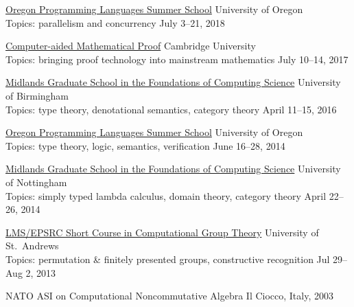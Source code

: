 \newcommand\ssitem[5]{\href{#1}{#2} \hfill #3 \\ Topics: #4 \hfill #5}

\ssitem
    {https://www.cs.uoregon.edu/research/summerschool/summer18/topics.php}
    {Oregon Programming Languages Summer School}
    {University of Oregon}
    {parallelism and concurrency}
    {July 3--21, 2018}

    \vspace{-3mm}

\ssitem
    {https://www.newton.ac.uk/event/bprw01}
    {Computer-aided Mathematical Proof}
    {Cambridge University}
    {bringing proof technology into mainstream mathematics}
    {July 10--14, 2017}
    
\vspace{-3mm}
    
\ssitem
    {http://www.cs.bham.ac.uk/~pbl/mgs2016/}
    {Midlands Graduate School in the Foundations of Computing Science}
    {University of Birmingham}
    {type theory, denotational semantics, category theory}
    {April 11--15, 2016}

    \vspace{-3mm}

\ssitem
    {https://www.cs.uoregon.edu/research/summerschool/summer14/curriculum.html}
    {Oregon Programming Languages Summer School}
    {University of Oregon}
    {type theory, logic, semantics, verification}
    {June 16--28, 2014}

    \vspace{-3mm}

\ssitem
    {http://www.cs.nott.ac.uk/~psztxa/mgs.2014/}
    {Midlands Graduate School in the Foundations of Computing Science}
    { University of Nottingham }
    {simply typed lambda calculus, domain theory, category theory}
    {April 22--26, 2014}

    \vspace{-3mm}

\ssitem
    {http://www-circa.mcs.st-and.ac.uk/cgt2013/}
    {LMS/EPSRC Short Course in Computational Group Theory}
    {University of St.~Andrews}
    {permutation \& finitely presented groups, constructive recognition}
    {Jul 29--Aug 2, 2013}

    \vspace{-3mm}

    NATO  ASI on Computational Noncommutative Algebra
           \hfill Il Ciocco, Italy, 2003 

